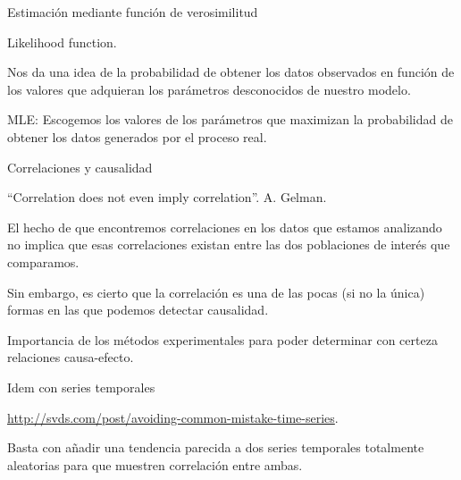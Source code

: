 \begin{frame}{Estimación mediante función de verosimilitud}
  \begin{wideitemize}
  \item Likelihood function.
  \item Nos da una idea de la probabilidad de obtener los datos observados
  en función de los valores que adquieran los parámetros desconocidos de nuestro
  modelo.
  \item MLE: Escogemos los valores de los parámetros que maximizan la probabilidad
  de obtener los datos generados por el proceso real.
 \end{wideitemize}

\end{frame}


\begin{frame}{Correlaciones y causalidad}
  \begin{wideitemize}
  \item ``Correlation does not even imply correlation''. A. Gelman.
  
  \item El hecho de que encontremos correlaciones en los datos que estamos
  analizando no implica que esas correlaciones existan entre las dos poblaciones
  de interés que comparamos.
  
  \item Sin embargo, es cierto que la correlación es una de las pocas (si no la
  única) formas en las que podemos detectar causalidad.
  
  \item Importancia de los métodos experimentales para poder determinar con certeza
  relaciones causa-efecto.

 \end{wideitemize}

\end{frame}


\begin{frame}{Idem con series temporales}
  \begin{wideitemize}
  \item \url{http://svds.com/post/avoiding-common-mistake-time-series}.
  
  \item Basta con añadir una tendencia parecida a dos series temporales totalmente
  aleatorias para que muestren correlación entre ambas.

 \end{wideitemize}

\end{frame}

